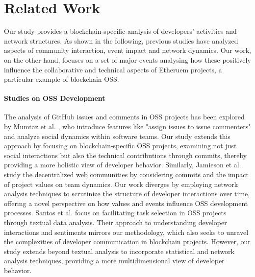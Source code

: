 \section{Related Work}
\label{rel_work}

Our study provides a blockchain-specific analysis of developers' activities and network structures. As shown in the following, previous studies have analyzed aspects of community interaction, event impact and network dynamics. Our work, on the other hand, focuses on a set of major events analysing how these positively influence the collaborative and technical aspects of Etheruem projects, a particular example of blockchain OSS. 
\paragraph{Studies on OSS Development}
The analysis of GitHub issues and comments in OSS projects has been explored by Mumtaz et al. \cite{Mumtaz202261}, who introduce features like "assign issues to issue commenters" and analyze social dynamics within software teams. Our study extends this approach by focusing on blockchain-specific OSS projects, examining not just social interactions but also the technical contributions through commits, thereby providing a more holistic view of developer behavior. Similarly, Jamieson et al. \cite{10548732} study the decentralized web communities by considering commits and the impact of project values on team dynamics. Our work diverges by employing network analysis techniques to scrutinize the structure of developer interactions over time, offering a novel perspective on how values and events influence OSS development processes.
Santos et al. \cite{Santos2023611} focus on facilitating task selection in OSS projects through textual data analysis. Their approach to understanding developer interactions and sentiments mirrors our methodology, which also seeks to unravel the complexities of developer communication in blockchain projects. However, our study extends beyond textual analysis to incorporate statistical and network analysis techniques, providing a more multidimensional view of developer behavior.
